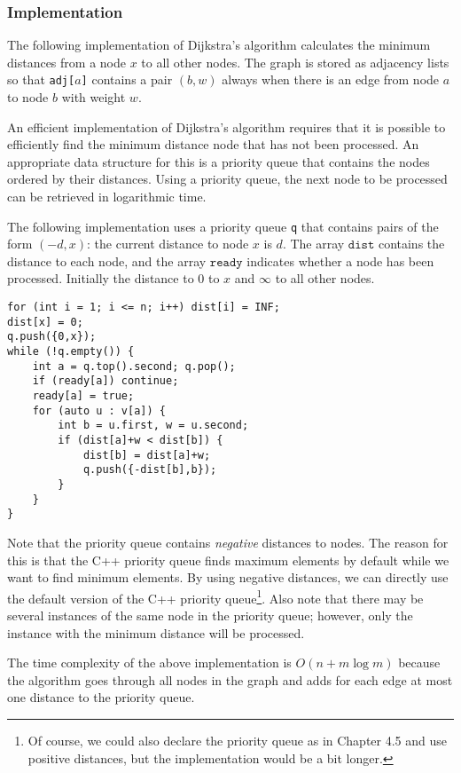 \subsubsection{Implementation}

The following implementation of Dijkstra's algorithm
calculates the minimum distances from a node $x$
to all other nodes.
The graph is stored as adjacency lists
so that \texttt{adj[$a$]} contains a pair $(b,w)$
always when there is an edge from node $a$ to node $b$
with weight $w$.

An efficient implementation of Dijkstra's algorithm
requires that it is possible to efficiently find the
minimum distance node that has not been processed.
An appropriate data structure for this is a priority queue
that contains the nodes ordered by their distances.
Using a priority queue, the next node to be processed
can be retrieved in logarithmic time.

The following implementation uses a priority queue
\texttt{q} that contains pairs of the form $(-d,x)$:
the current distance to node $x$ is $d$.
The array $\texttt{dist}$ contains the distance to
each node, and the array $\texttt{ready}$ indicates
whether a node has been processed.
Initially the distance to $0$ to $x$ and $\infty$ to all other nodes.

\begin{lstlisting}
for (int i = 1; i <= n; i++) dist[i] = INF;
dist[x] = 0;
q.push({0,x});
while (!q.empty()) {
    int a = q.top().second; q.pop();
    if (ready[a]) continue;
    ready[a] = true;
    for (auto u : v[a]) {
        int b = u.first, w = u.second;
        if (dist[a]+w < dist[b]) {
            dist[b] = dist[a]+w;
            q.push({-dist[b],b});
        }
    }
}
\end{lstlisting}

Note that the priority queue contains \emph{negative}
distances to nodes.
The reason for this is that the C++ priority queue finds maximum
elements by default while we want to find minimum elements.
By using negative distances,
we can directly use the default version of the C++ priority queue\footnote{Of
course, we could also declare the priority queue as in Chapter 4.5
and use positive distances, but the implementation would be a bit longer.}.
Also note that there may be several instances of the same
node in the priority queue; however, only the instance with the
minimum distance will be processed.

The time complexity of the above implementation is
$O(n+m \log m)$ because the algorithm goes through
all nodes in the graph and adds for each edge
at most one distance to the priority queue.

